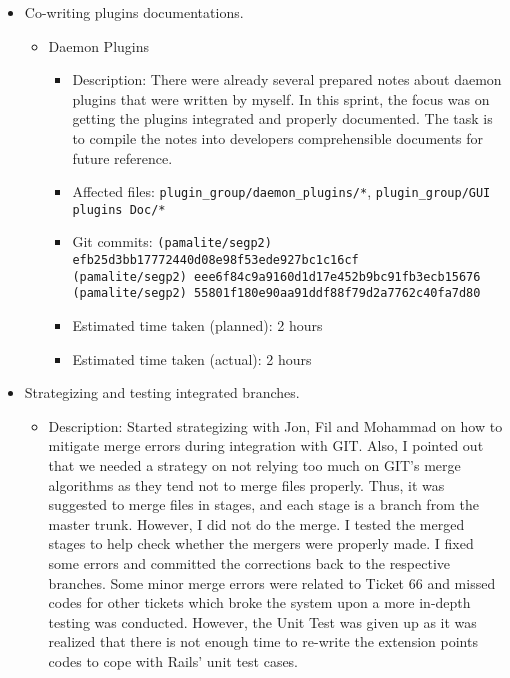 \begin{itemize}
    \item Co-writing plugins documentations.
        \begin{itemize}
            \item Daemon Plugins
                \begin{itemize}
                    \item Description: There were already several prepared notes about daemon plugins that were written by myself. In this sprint, the focus was on getting the plugins integrated and properly documented. The task is to compile the notes into developers comprehensible documents for future reference. 
                    \item Affected files: \texttt{plugin\_group/daemon\_plugins/*}, \texttt{plugin\_group/GUI plugins Doc/*}
                    \item Git commits: \texttt{(pamalite/segp2) efb25d3bb17772440d08e98f53ede927bc1c16cf} \\
                        \texttt{(pamalite/segp2) eee6f84c9a9160d1d17e452b9bc91fb3ecb15676} \\
                        \texttt{(pamalite/segp2) 55801f180e90aa91ddf88f79d2a7762c40fa7d80} 
                    \item Estimated time taken (planned): 2 hours
                    \item Estimated time taken (actual): 2 hours
                \end{itemize}
        \end{itemize}
    \item Strategizing and testing integrated branches.
        \begin{itemize}
            \item Description: Started strategizing with Jon, Fil and Mohammad on how to mitigate merge errors during integration with GIT. Also, I pointed out that we needed a strategy on not relying too much on GIT's merge algorithms as they tend not to merge files properly. Thus, it was suggested to merge files in stages, and each stage is a branch from the master trunk. However, I did not do the merge. I tested the merged stages to help check whether the mergers were properly made. I fixed some errors and committed the corrections back to the respective branches. Some minor merge errors were related to Ticket 66 and missed codes for other tickets which broke the system upon a more in-depth testing was conducted. However, the Unit Test was given up as it was realized that there is not enough time to re-write the extension points codes to cope with Rails' unit test cases. 

\end{itemize}
\end{itemize}
